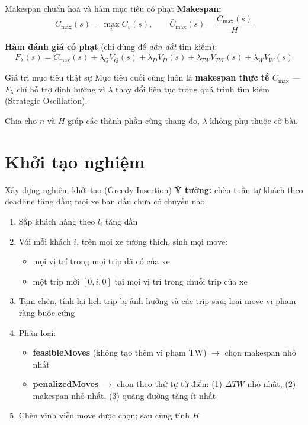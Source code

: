 \documentclass[aspectratio=169]{beamer}
\newcommand{\hl}[1]{\textcolor{blue!60!black}{\textbf{#1}}}
\begin{document}
\begin{frame}{Makespan chuẩn hoá và hàm mục tiêu có phạt}
  \textbf{Makespan:}
  $$C_{\max}(s) = \max_v C_v(s), \qquad \bar{C}_{\max}(s) = \frac{C_{\max}(s)}{H}$$

  \textbf{Hàm đánh giá có phạt} (chỉ dùng để \emph{dẫn dắt} tìm kiếm):
  $$F_\lambda(s) = \bar{C}_{\max}(s) + \lambda_Q V_Q(s) + \lambda_D V_D(s) + \lambda_{TW} V_{TW}(s) + \lambda_W V_W(s)$$

  \begin{alertblock}{Giá trị mục tiêu thật sự}
    Mục tiêu cuối cùng luôn là \hl{makespan thực tế $C_{\max}$} — $F_\lambda$ chỉ hỗ trợ định hướng vì $\lambda$ thay đổi liên tục trong quá trình tìm kiếm (Strategic Oscillation).
  \end{alertblock}

  \small Chia cho $n$ và $H$ giúp các thành phần cùng thang đo, $\lambda$ không phụ thuộc cỡ bài.
\end{frame}

\section{Khởi tạo nghiệm}

\begin{frame}{Xây dựng nghiệm khởi tạo (Greedy Insertion)}
  \textbf{Ý tưởng:} chèn tuần tự khách theo deadline tăng dần; mọi xe ban đầu chưa có chuyến nào.

  \begin{enumerate}
    \item Sắp khách hàng theo $l_i$ tăng dần
    \item Với mỗi khách $i$, trên mọi xe tương thích, sinh mọi move:
    \begin{itemize}
      \item \small mọi vị trí trong mọi trip đã có của xe
      \item \small một trip mới $[0,i,0]$ tại mọi vị trí trong chuỗi trip của xe
    \end{itemize}
    \item Tạm chèn, tính lại lịch trip bị ảnh hưởng và các trip sau; loại move vi phạm ràng buộc cứng
    \item Phân loại:
    \begin{itemize}
      \item \small \textbf{feasibleMoves} (không tạo thêm vi phạm TW) $\to$ chọn makespan nhỏ nhất
      \item \small \textbf{penalizedMoves} $\to$ chọn theo thứ tự từ điển: (1) $\Delta TW$ nhỏ nhất, (2) makespan nhỏ nhất, (3) quãng đường tăng ít nhất
    \end{itemize}
    \item Chèn vĩnh viễn move được chọn; sau cùng tính $H$
  \end{enumerate}
\end{frame}
\end{document}
